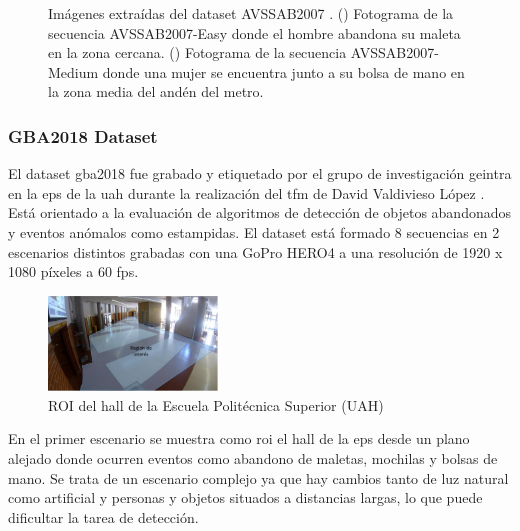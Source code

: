 \begin{figure}[ht]
\begin{subfigure}[b]{0.4\textwidth}
    \caption{}
    \label{fig:avssab2007_2}
  \end{subfigure}
  \caption{Imágenes extraídas del dataset AVSSAB2007 \cite{AVSSAB2007-dataset}.
    (\protect{}) Fotograma de la secuencia AVSSAB2007-Easy donde el hombre abandona su maleta en la zona cercana.
    (\protect{}) Fotograma de la secuencia AVSSAB2007-Medium donde una mujer se encuentra junto a su bolsa de mano en la zona media del andén del metro.}
  \label{fig:avssab2007_near_medium}
\end{figure}

\subsubsection{GBA2018 Dataset}

El dataset \gls{gba2018} \cite{gba-dataset} fue grabado y etiquetado por el grupo de investigación \gls{geintra} en la \gls{eps} de la \gls{uah} durante la realización del \gls{tfm} de David Valdivieso López \cite{valdivieso2018}. Está orientado a la evaluación de algoritmos de detección de objetos abandonados y eventos anómalos como estampidas. El dataset está formado 8 secuencias en 2 escenarios distintos grabadas con una GoPro HERO4 a una resolución de 1920 x 1080 píxeles a 60 \gls{fps}.

\begin{figure}[ht]
\centering
\includegraphics[width=0.4\textwidth]{img/chapters/resultados/datasets/hall-eps.jpg}
\caption{\label{fig:roi-hall-eps}ROI del hall de la Escuela Politécnica Superior (UAH)}
\end{figure}

En el primer escenario se muestra como \gls{roi} el hall de la \gls{eps} desde un plano alejado donde ocurren eventos como abandono de maletas, mochilas y bolsas de mano. Se trata de un escenario complejo ya que hay cambios tanto de luz natural como artificial y personas y objetos situados a distancias largas, lo que puede dificultar la tarea de detección.

